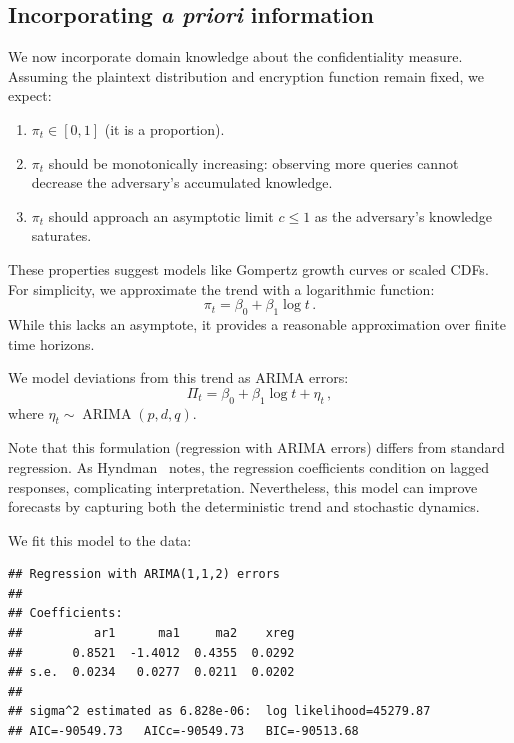 \documentclass[final,11pt]{article}
\newcommand{\arima}{\operatorname{ARIMA}}
\theoremstyle{plain}
\theoremstyle{remark}
\begin{document}
\hypertarget{incorporating-information}{%
\subsection{\texorpdfstring{Incorporating \emph{a priori}
information}{Incorporating  information}}\label{incorporating-information}}

We now incorporate domain knowledge about the confidentiality measure.
Assuming the plaintext distribution and encryption function remain fixed,
we expect:

\begin{enumerate}
\item $\pi_t \in [0,1]$ (it is a proportion).
\item $\pi_t$ should be monotonically increasing: observing more queries
cannot decrease the adversary's accumulated knowledge.
\item $\pi_t$ should approach an asymptotic limit $c \leq 1$ as the
adversary's knowledge saturates.
\end{enumerate}

These properties suggest models like Gompertz growth curves or scaled CDFs.
For simplicity, we approximate the trend with a logarithmic function:
\begin{equation}
  \pi_t = \beta_0 + \beta_1 \log t\,.
\end{equation}
While this lacks an asymptote, it provides a reasonable approximation over
finite time horizons.

We model deviations from this trend as ARIMA errors:
\begin{equation}
  \Pi_t = \beta_0 + \beta_1 \log t + \eta_t\,,
\end{equation}
where $\eta_t \sim \arima(p,d,q)$.

Note that this formulation (regression with ARIMA errors) differs from
standard regression. As Hyndman~\cite{rob_arimax} notes, the regression
coefficients condition on lagged responses, complicating interpretation.
Nevertheless, this model can improve forecasts by capturing both the
deterministic trend and stochastic dynamics.

We fit this model to the data:

\begin{verbatim}
## Regression with ARIMA(1,1,2) errors
##
## Coefficients:
##          ar1      ma1     ma2    xreg
##       0.8521  -1.4012  0.4355  0.0292
## s.e.  0.0234   0.0277  0.0211  0.0202
##
## sigma^2 estimated as 6.828e-06:  log likelihood=45279.87
## AIC=-90549.73   AICc=-90549.73   BIC=-90513.68
\end{verbatim}
\end{document}
